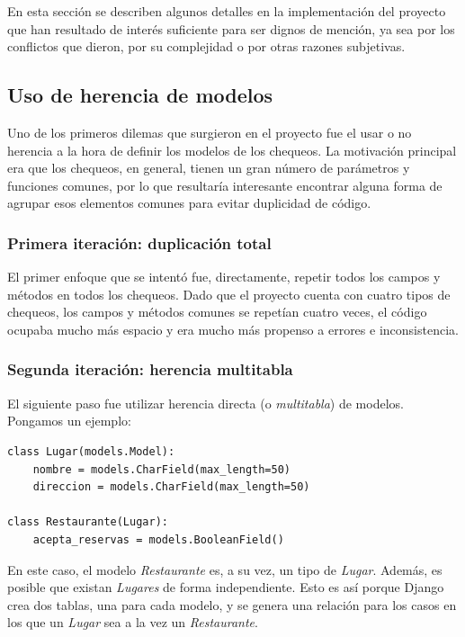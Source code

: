 En esta sección se describen algunos detalles en la implementación del proyecto
que han resultado de interés suficiente para ser dignos de mención, ya sea por
los conflictos que dieron, por su complejidad o por otras razones subjetivas.

\subsection{Uso de herencia de modelos}

Uno de los primeros dilemas que surgieron en el proyecto fue el usar o no
herencia a la hora de definir los modelos de los chequeos. La motivación
principal era que los chequeos, en general, tienen un gran número de parámetros
y funciones comunes, por lo que resultaría interesante encontrar alguna forma de
agrupar esos elementos comunes para evitar duplicidad de código.

\subsubsection{Primera iteración: duplicación total}

El primer enfoque que se intentó fue, directamente, repetir todos los campos y
métodos en todos los chequeos. Dado que el proyecto cuenta con cuatro tipos de
chequeos, los campos y métodos comunes se repetían cuatro veces, el código
ocupaba mucho más espacio y era mucho más propenso a errores e inconsistencia.

\subsubsection{Segunda iteración: herencia multitabla}

El siguiente paso fue utilizar herencia directa (o \textit{multitabla}) de
modelos. Pongamos un ejemplo:

\begin{verbatim}
class Lugar(models.Model):
    nombre = models.CharField(max_length=50)
    direccion = models.CharField(max_length=50)

class Restaurante(Lugar):
    acepta_reservas = models.BooleanField()
\end{verbatim}

En este caso, el modelo \textit{Restaurante} es, a su vez, un tipo de
\textit{Lugar}. Además, es posible que existan \textit{Lugares} de forma
independiente. Esto es así porque Django crea dos tablas, una para cada modelo,
y se genera una relación para los casos en los que un \textit{Lugar} sea a la
vez un \textit{Restaurante}.

